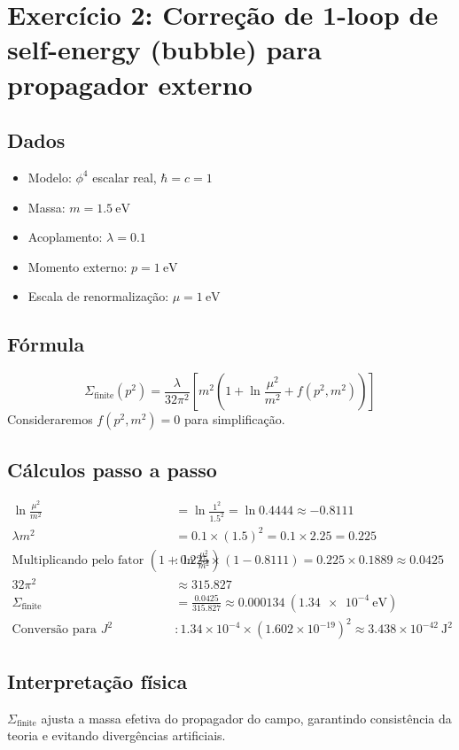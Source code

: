 \documentclass[12pt,a4paper]{article}
\begin{document}
\newpage
\section*{Exercício 2: Correção de 1-loop de self-energy (bubble) para propagador externo}

\subsection*{Dados}
\begin{itemize}
    \item Modelo: $\phi^4$ escalar real, $\hbar = c = 1$
    \item Massa: $m = \SI{1.5}{\electronvolt}$
    \item Acoplamento: $\lambda = 0.1$
    \item Momento externo: $p = \SI{1}{\electronvolt}$
    \item Escala de renormalização: $\mu = \SI{1}{\electronvolt}$
\end{itemize}

\subsection*{Fórmula}
\[
\Sigma_\text{finite}(p^2) = \frac{\lambda}{32\pi^2} \left[ m^2 \left(1 + \ln \frac{\mu^2}{m^2} + f(p^2, m^2) \right) \right]
\]
Consideraremos $f(p^2, m^2) = 0$ para simplificação.

\subsection*{Cálculos passo a passo}
\begin{align*}
\ln \frac{\mu^2}{m^2} &= \ln \frac{1^2}{1.5^2} = \ln 0.4444 \approx -0.8111 \\
\lambda m^2 &= 0.1 \times (1.5)^2 = 0.1 \times 2.25 = 0.225 \\
\text{Multiplicando pelo fator } (1 + \ln \frac{\mu^2}{m^2}) &: 0.225 \times (1 - 0.8111) = 0.225 \times 0.1889 \approx 0.0425 \\
32\pi^2 &\approx 315.827 \\
\Sigma_\text{finite} &= \frac{0.0425}{315.827} \approx 0.000134~(\SI{1.34e-4}{\electronvolt}) \\
\text{Conversão para } J^2 &: 1.34\times 10^{-4} \times (1.602\times 10^{-19})^2 \approx 3.438\times 10^{-42}~\text{J}^2
\end{align*}

\subsection*{Interpretação física}
$\Sigma_\text{finite}$ ajusta a massa efetiva do propagador do campo, garantindo consistência da teoria e evitando divergências artificiais.
\end{document}
